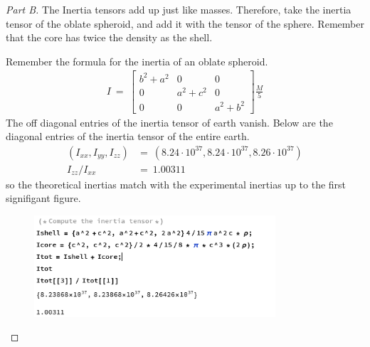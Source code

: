 \documentclass{article}
\numberwithin{equation}{section}
\begin{document}
\begin{proof}[Part B]
    The Inertia tensors add up just like masses. Therefore, take the inertia 
    tensor of the oblate spheroid, and add it with the tensor of the sphere. 
    Remember that the core has twice the density as the shell. 

    Remember the formula for the inertia of an oblate spheroid. 
    \begin{align}
        I \ = \ \begin{bmatrix}
            b^2 + a^2 & 0 & 0 \\ 
            0 & a^2 + c^2 & 0 \\ 
            0 & 0 & a^2 + b^2 
        \end{bmatrix} \frac M 5
    \end{align}
    The off diagonal entries of the inertia tensor of earth vanish. 
    Below are the diagonal entries of the inertia tensor of the entire earth. 
    \begin{align}
        (I_{xx}, I_{yy}, I_{zz}) & = \ (8.24\cdot 10^{37}, 8.24\cdot 10^{37}, 8.26\cdot 10^{37}) \\ 
        I_{zz}/I_{xx} & = \ 1.00311
    \end{align}
    so the theoretical inertias match with the experimental inertias 
    up to the first signifigant figure. 

    \begin{figure}[h]
        \centering
        \includegraphics[width=0.8\textwidth]{Q5_b.png} %
        \label{fig:example}
    \end{figure}
    
\end{proof}
\end{document}
